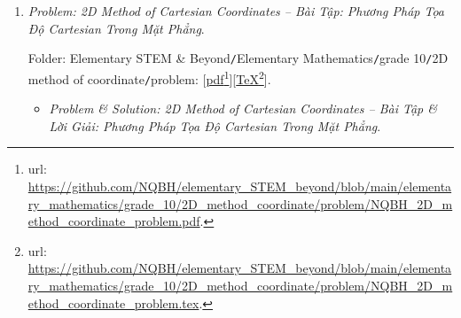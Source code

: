 \documentclass[12pt]{article}
\begin{document}
\begin{enumerate}
	Folder: {\sf Elementary STEM \& Beyond{\tt/}Elementary Mathematics{\tt/}grade 10{\tt/}probability \& statistics{\tt/}problem}: [\href{https://github.com/NQBH/elementary_STEM_beyond/blob/main/elementary_mathematics/grade_10/probability_statistics/problem/NQBH_probability_statistics_problem.pdf}{pdf}\footnote{{\sc url}: \url{https://github.com/NQBH/elementary_STEM_beyond/blob/main/elementary_mathematics/grade_10/probability_statistics/problem/NQBH_probability_statistics_problem.pdf}.}][\href{https://github.com/NQBH/elementary_STEM_beyond/blob/main/elementary_mathematics/grade_10/probability_statistics/problem/NQBH_probability_statistics_problem.tex}{\TeX}\footnote{{\sc url}: \url{https://github.com/NQBH/elementary_STEM_beyond/blob/main/elementary_mathematics/grade_10/probability_statistics/problem/NQBH_probability_statistics_problem.tex}.}].
	\begin{itemize}
		\item {\it Problem \& Solution: Probability \& Statistics -- Bài Tập \& Lời Giải: Xác Suất \& Thống Kê}.
		
		Folder: {\sf Elementary STEM \& Beyond{\tt/}Elementary Mathematics{\tt/}grade 10{\tt/}probability \& statistics{\tt/}solution}: [\href{https://github.com/NQBH/elementary_STEM_beyond/blob/main/elementary_mathematics/grade_10/probability_statistics/solution/NQBH_probability_statistics_solution.pdf}{pdf}\footnote{{\sc url}: \url{https://github.com/NQBH/elementary_STEM_beyond/blob/main/elementary_mathematics/grade_10/probability_statistics/solution/NQBH_probability_statistics_solution.pdf}.}][\href{https://github.com/NQBH/elementary_STEM_beyond/blob/main/elementary_mathematics/grade_10/probability_statistics/solution/NQBH_probability_statistics_solution.tex}{\TeX}\footnote{{\sc url}: \url{https://github.com/NQBH/elementary_STEM_beyond/blob/main/elementary_mathematics/grade_10/probability_statistics/solution/NQBH_probability_statistics_solution.tex}.}].
	\end{itemize}
	\item {\it Problem: 2D Method of Cartesian Coordinates -- Bài Tập: Phương Pháp Tọa Độ Cartesian Trong Mặt Phẳng}.
	
	Folder: {\sf Elementary STEM \& Beyond{\tt/}Elementary Mathematics{\tt/}grade 10{\tt/}2D method of coordinate{\tt/}problem}: [\href{https://github.com/NQBH/elementary_STEM_beyond/blob/main/elementary_mathematics/grade_10/2D_method_coordinate/problem/NQBH_2D_method_coordinate_problem.pdf}{pdf}\footnote{{\sc url}: \url{https://github.com/NQBH/elementary_STEM_beyond/blob/main/elementary_mathematics/grade_10/2D_method_coordinate/problem/NQBH_2D_method_coordinate_problem.pdf}.}][\href{https://github.com/NQBH/elementary_STEM_beyond/blob/main/elementary_mathematics/grade_10/2D_method_coordinate/problem/NQBH_2D_method_coordinate_problem.tex}{\TeX}\footnote{{\sc url}: \url{https://github.com/NQBH/elementary_STEM_beyond/blob/main/elementary_mathematics/grade_10/2D_method_coordinate/problem/NQBH_2D_method_coordinate_problem.tex}.}].
	\begin{itemize}
		\item {\it Problem \& Solution: 2D Method of Cartesian Coordinates -- Bài Tập \& Lời Giải: Phương Pháp Tọa Độ Cartesian Trong Mặt Phẳng}.
		

\end{itemize}
\end{enumerate}
\end{document}
